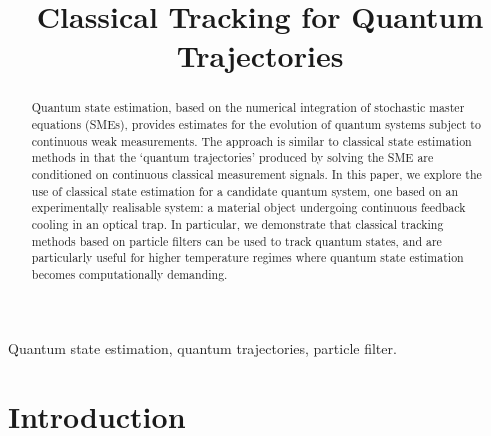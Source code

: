 \documentclass[conference]{IEEEtran}
\begin{document}
\title{Classical Tracking for Quantum Trajectories}

\author{
}

\maketitle

\begin{abstract}
Quantum state estimation, based on the numerical integration of stochastic master equations (SMEs), provides estimates for the evolution of quantum systems subject to continuous weak measurements. The approach is similar to classical state estimation methods in that the `quantum trajectories' produced by solving the SME are conditioned on continuous classical measurement signals. In this paper, we explore the use of classical state estimation for a candidate quantum system, one based on an experimentally realisable system: a material object undergoing continuous feedback cooling in an optical trap. In particular, we demonstrate that classical tracking methods based on particle filters can be used to track quantum states, and are particularly useful for higher temperature regimes where quantum state estimation becomes computationally demanding. 
\end{abstract}

\begin{IEEEkeywords}
Quantum state estimation, quantum trajectories, particle filter.
\end{IEEEkeywords}

\IEEEpeerreviewmaketitle

\section{Introduction}\label{intro}
\end{document}
